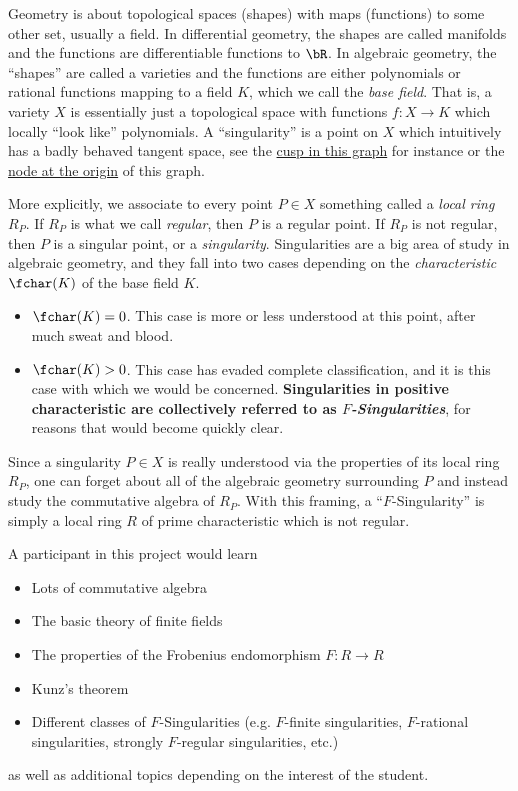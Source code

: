 Geometry is about topological spaces (shapes) with maps (functions) to some other set, usually a field. In differential geometry, the shapes are called manifolds and the functions are differentiable functions to $\bR$. In algebraic geometry, the ``shapes'' are called a varieties and the functions are either polynomials or rational functions mapping to a field $K$, which we call the \emph{base field}. That is, a variety $X$ is essentially just a topological space with functions $f:X\to K$ which locally ``look like'' polynomials. A ``singularity'' is a point on $X$ which intuitively has a badly behaved tangent space, see the \href{https://www.desmos.com/calculator/rvbmomcqge}{cusp in this graph} for instance or the \href{https://www.desmos.com/calculator/bgga6nyvyu}{node at the origin} of this graph.

More explicitly, we associate to every point $P \in X$ something called a \emph{local ring} $R_P$. If $R_P$ is what we call \emph{regular}, then $P$ is a regular point. If $R_P$ is not regular, then $P$ is a singular point, or a \emph{singularity}. Singularities are a big area of study in algebraic geometry, and they fall into two cases depending on the \emph{characteristic} $\fchar(K)$ of the base field $K$.
\begin{itemize}
	\item $\fchar(K) = 0$. This case is more or less understood at this point, after much sweat and blood.
	\item $\fchar(K) > 0$. This case has evaded complete classification, and it is this case with which we would be concerned. \textbf{Singularities in positive characteristic are collectively referred to as \emph{$F$-Singularities}}, for reasons that would become quickly clear.
\end{itemize}
Since a singularity $P \in X$ is really understood via the properties of its local ring $R_P$, one can forget about all of the algebraic geometry surrounding $P$ and instead study the commutative algebra of $R_P$. With this framing, a ``$F$-Singularity'' is simply a local ring $R$ of prime characteristic which is not regular.

A participant in this project would learn
\begin{itemize}
	\item Lots of commutative algebra
	\item The basic theory of finite fields
	\item The properties of the Frobenius endomorphism $F:R\to R$
	\item Kunz's theorem
	\item Different classes of $F$-Singularities (e.g. $F$-finite singularities, $F$-rational singularities, strongly $F$-regular singularities, etc.)
\end{itemize}
as well as additional topics depending on the interest of the student.

